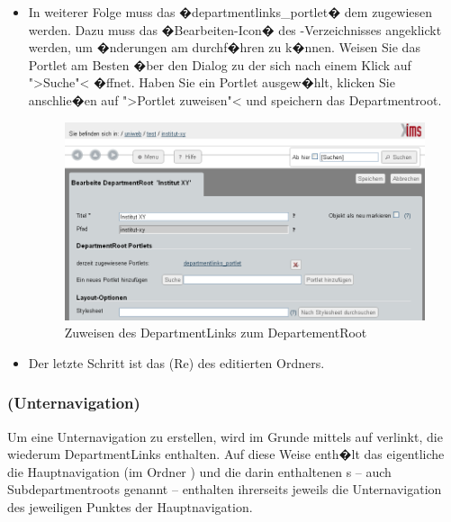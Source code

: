 \begin{itemize}
\item {In weiterer Folge muss das �departmentlinks\_portlet� dem
     zugewiesen werden. Dazu muss das
    �Bearbeiten-Icon� des -Verzeichnisses
    angeklickt werden, um �nderungen am 
    durchf�hren zu k�nnen. Weisen Sie das Portlet am Besten �ber den Dialog zu der sich nach einem Klick auf ">Suche"< �ffnet. Haben Sie ein Portlet ausgew�hlt, klicken Sie anschlie�en auf ">Portlet zuweisen"< und speichern das Departmentroot.}

\begin{figure}[!ht]
  \centering
  \includegraphics[width=\textwidth]{./images/zuweisendepartmentlinksportlet.png}
  \caption{Zuweisen des DepartmentLinks  zum
    DepartementRoot}
  \label{fig:deplinkportletzuweisen}
\end{figure}

\item {Der letzte Schritt ist das (Re) des
    editierten  Ordners.}
\end{itemize} 

\subsubsection{ (Unternavigation)}
\label{subdeplinks}
 
Um eine Unternavigation zu erstellen, wird im Grunde mittels
 auf  verlinkt, die
wiederum DepartmentLinks enthalten. Auf diese Weise enth�lt das
eigentliche  die Hauptnavigation (im Ordner
) und die darin enthaltenen
s -- auch Subdepartmentroots genannt --
enthalten ihrerseits jeweils die Unternavigation des jeweiligen
Punktes der Hauptnavigation.

